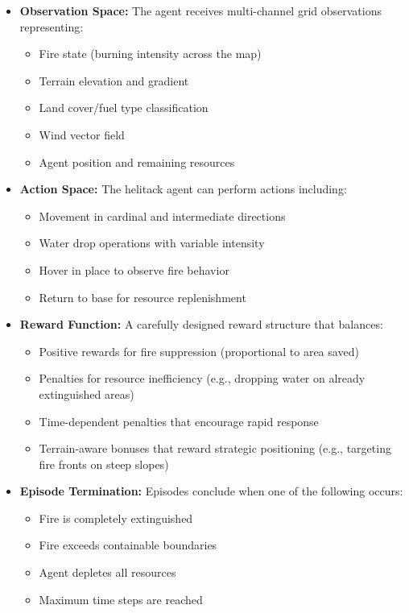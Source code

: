 \documentclass[conference]{IEEEtran}
\begin{document}
\begin{itemize}
    \item \textbf{Observation Space:} The agent receives multi-channel grid observations representing:
    \begin{itemize}
        \item Fire state (burning intensity across the map)
        \item Terrain elevation and gradient
        \item Land cover/fuel type classification
        \item Wind vector field
        \item Agent position and remaining resources
    \end{itemize}
    
    \item \textbf{Action Space:} The helitack agent can perform actions including:
    \begin{itemize}
        \item Movement in cardinal and intermediate directions
        \item Water drop operations with variable intensity
        \item Hover in place to observe fire behavior
        \item Return to base for resource replenishment
    \end{itemize}
    
    \item \textbf{Reward Function:} A carefully designed reward structure that balances:
    \begin{itemize}
        \item Positive rewards for fire suppression (proportional to area saved)
        \item Penalties for resource inefficiency (e.g., dropping water on already extinguished areas)
        \item Time-dependent penalties that encourage rapid response
        \item Terrain-aware bonuses that reward strategic positioning (e.g., targeting fire fronts on steep slopes)
    \end{itemize}

    
    \item \textbf{Episode Termination:} Episodes conclude when one of the following occurs:
    \begin{itemize}
        \item Fire is completely extinguished
        \item Fire exceeds containable boundaries
        \item Agent depletes all resources
        \item Maximum time steps are reached
    \end{itemize}
\end{itemize}
\end{document}
